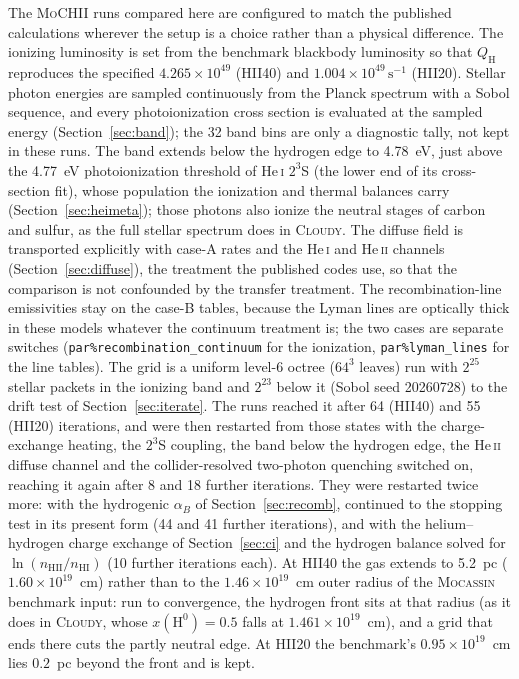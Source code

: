 \documentclass[twocolumn,linenumbers]{aastex702}
\newcommand{\code}[1]{\texttt{#1}}
\newcommand{\MoCHII}{\textsc{MoCHII}}
\newcommand{\HeI}{He\,\textsc{i}}
\newcommand{\HeII}{He\,\textsc{ii}}
\newcommand{\QH}{Q_{\mathrm{H}}}
\begin{document}
The \MoCHII{} runs compared here are configured to match the published
calculations wherever the setup is a choice rather than a physical
difference.  The ionizing luminosity is set from the benchmark blackbody
luminosity so that $\QH$ reproduces the specified $4.265\times10^{49}$
(HII40) and $1.004\times10^{49}\,\mathrm{s^{-1}}$ (HII20).  Stellar photon
energies are sampled continuously from the Planck spectrum with a Sobol
sequence, and every photoionization cross section is evaluated at the
sampled energy (Section~\ref{sec:band}); the 32 band bins are only a
diagnostic tally, not kept in these runs.  The band extends below the hydrogen edge to 4.78~eV,
just above the 4.77~eV photoionization threshold of \HeI{} $2^3$S (the lower
end of its cross-section fit), whose population the ionization and
thermal balances carry (Section~\ref{sec:heimeta}); those photons also
ionize the neutral stages of carbon and sulfur, as the full stellar spectrum
does in \textsc{Cloudy}.  The diffuse field is transported explicitly with
case-A rates and the \HeI{} and \HeII{} channels
(Section~\ref{sec:diffuse}), the treatment the published codes use, so that
the comparison is not confounded by the transfer treatment.
The recombination-line emissivities
stay on the case-B tables, because the Lyman lines are optically thick in
these models whatever the continuum treatment is; the two cases are
separate switches (\code{par\%recombination\_continuum} for the ionization,
\code{par\%lyman\_lines} for the line tables).  The grid is a uniform level-6
octree ($64^3$ leaves) run with $2^{25}$ stellar packets in the ionizing band
and $2^{23}$ below it (Sobol seed 20260728) to the drift test of
Section~\ref{sec:iterate}.  The runs reached it after 64 (HII40) and 55
(HII20) iterations, and were then restarted from those states with the
charge-exchange heating, the $2^3$S coupling, the band below the hydrogen
edge, the \HeII{} diffuse channel and the collider-resolved
two-photon quenching switched on, reaching it again after 8 and 18 further
iterations.  They were restarted twice more: with the hydrogenic $\alpha_B$
of Section~\ref{sec:recomb}, continued to the stopping test in its present
form (44 and 41 further iterations), and with the helium--hydrogen charge
exchange of Section~\ref{sec:ci} and the hydrogen balance solved for
$\ln(n_{\mathrm{HII}}/n_{\mathrm{HI}})$ (10 further iterations each).  At HII40 the gas extends to
5.2~pc ($1.60\times10^{19}$~cm) rather than to the $1.46\times10^{19}$~cm
outer radius of the \textsc{Mocassin} benchmark input: run to convergence,
the hydrogen front sits at that radius (as it does in \textsc{Cloudy}, whose
$x(\mathrm{H^{0}}) = 0.5$ falls at $1.461\times10^{19}$~cm), and a grid that
ends there cuts the partly neutral edge.  At HII20 the benchmark's
$0.95\times10^{19}$~cm lies $0.2$~pc beyond the front and is kept.
\end{document}
